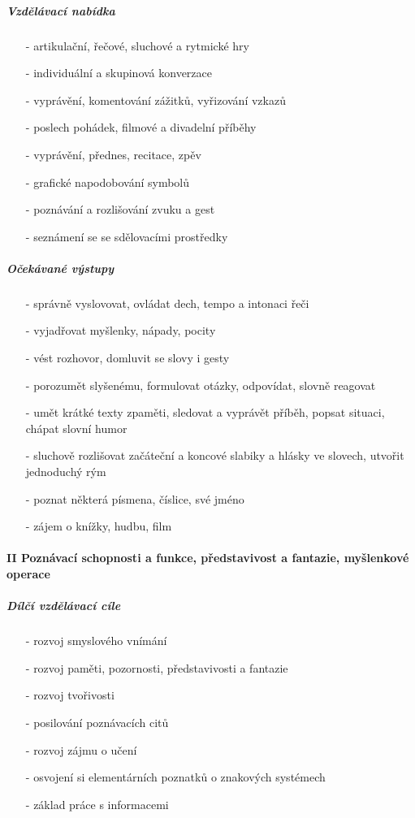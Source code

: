					\subparagraph{Vzdělávací nabídka}

					\begin{itemize}
					\setlength\itemsep{-2mm}
						\item[-]artikulační, řečové, sluchové a rytmické hry
						\item[-]individuální a skupinová  konverzace
						\item[-]vyprávění, komentování zážitků, vyřizování vzkazů
						\item[-]poslech pohádek, filmové a divadelní příběhy
						\item[-]vyprávění, přednes, recitace, zpěv
						\item[-]grafické napodobování symbolů
						\item[-]poznávání a rozlišování zvuku a gest
						\item[-]seznámení se se sdělovacími prostředky
					\end{itemize}

					\subparagraph{Očekávané výstupy}

					\begin{itemize}
					\setlength\itemsep{-2mm}
						\item[-]správně vyslovovat, ovládat dech, tempo a intonaci řeči
						\item[-]vyjadřovat myšlenky, nápady, pocity
						\item[-]vést rozhovor, domluvit se slovy i gesty
						\item[-]porozumět slyšenému, formulovat otázky, odpovídat, slovně reagovat
						\item[-]umět krátké texty zpaměti, sledovat a vyprávět příběh, popsat situaci, chápat slovní humor
						\item[-]sluchově rozlišovat začáteční a koncové slabiky a hlásky ve slovech, utvořit jednoduchý rým
						\item[-]poznat některá písmena, číslice, své jméno
						\item[-]zájem o knížky, hudbu, film
					\end{itemize}
				
				\paragraph{II Poznávací schopnosti a funkce, představivost a fantazie, myšlenkové operace}
				\textcolor{white}{ } 

					\subparagraph{Dílčí vzdělávací cíle}

					\begin{itemize}
					\setlength\itemsep{-2mm}
						\item[-]rozvoj smyslového vnímání
						\item[-]rozvoj paměti, pozornosti, představivosti a fantazie
						\item[-]rozvoj tvořivosti
						\item[-]posilování poznávacích citů
						\item[-]rozvoj zájmu o učení
						\item[-]osvojení si elementárních poznatků o znakových systémech
						\item[-]základ práce s informacemi
					\end{itemize}
					
